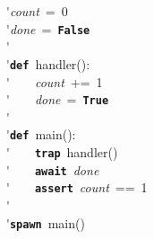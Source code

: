 \'\>\textit{count}~=~0\\

\'\>\textit{done}~=~\texttt{\textbf{False}}\\

\'\>\\

\'\>\texttt{\textbf{def}}~handler():\\

\'\>~~~~\textit{count}~+=~1\\

\'\>~~~~\textit{done}~=~\texttt{\textbf{True}}\\

\'\>\\

\'\>\texttt{\textbf{def}}~main():\\

\'\>~~~~\texttt{\textbf{trap}}~handler()\\

\'\>~~~~\texttt{\textbf{await}}~\textit{done}\\

\'\>~~~~\texttt{\textbf{assert}}~\textit{count}~==~1\\

\'\>\\

\'\>\texttt{\textbf{spawn}}~main()